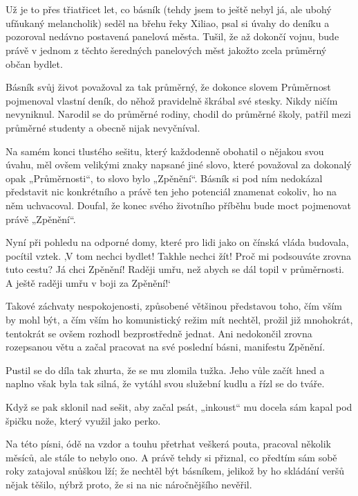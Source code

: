 \chapter{}
Už je to přes třiatřicet let, co básník (tehdy jsem to ještě nebyl já, ale ubohý ufňukaný melancholik) seděl na břehu řeky Xiliao, psal si úvahy do deníku a pozoroval nedávno postavená panelová města. Tušil, že až dokončí vojnu, bude právě v jednom z těchto šeredných panelových měst jakožto zcela průměrný občan bydlet.

Básník svůj život považoval za tak průměrný, že dokonce slovem Průměrnost pojmenoval vlastní deník, do něhož pravidelně škrábal své stesky. Nikdy ničím nevyniknul. Narodil se do průměrné rodiny, chodil do průměrné školy, patřil mezi průměrné studenty a obecně nijak nevyčníval.

Na samém konci tlustého sešitu, který každodenně obohatil o nějakou svou úvahu, měl ovšem velikými znaky napsané jiné slovo, které považoval za dokonalý opak „Průměrnosti“, to slovo bylo „Zpěnění“. Básník si pod ním nedokázal představit nic konkrétního a právě ten jeho potenciál znamenat cokoliv, ho na něm uchvacoval. Doufal, že konec svého životního příběhu bude moct pojmenovat právě „Zpěnění“.

 Nyní při pohledu na odporné domy, které pro lidi jako on čínská vláda budovala, pocítil vztek. ‚V tom nechci bydlet! Takhle nechci žít! Proč mi podsouváte zrovna tuto cestu? Já chci Zpěnění! Raději umřu, než abych se dál topil v průměrnosti. A ještě raději umřu v boji za Zpěnění!‘ 

Takové záchvaty nespokojenosti, způsobené většinou představou toho, čím vším by mohl být, a čím vším ho komunistický režim mít nechtěl, prožil již mnohokrát, tentokrát se ovšem rozhodl bezprostředně jednat. Ani nedokončil zrovna rozepsanou větu a začal pracovat na své poslední básni, manifestu Zpěnění.

Pustil se do díla tak zhurta, že se mu zlomila tužka. Jeho vůle začít hned a naplno však byla tak silná, že vytáhl svou služební kudlu a řízl se do tváře.

Když se pak sklonil nad sešit, aby začal psát, „inkoust“ mu docela sám kapal pod špičku nože, který využil jako perko.

Na této písni, ódě na vzdor a touhu přetrhat veškerá pouta, pracoval několik měsíců, ale stále to nebylo ono. A právě tehdy si přiznal, co předtím sám sobě roky zatajoval snůškou lží; že nechtěl být básníkem, jelikož by ho skládání veršů nějak těšilo, nýbrž proto, že si na nic náročnějšího nevěřil. 

